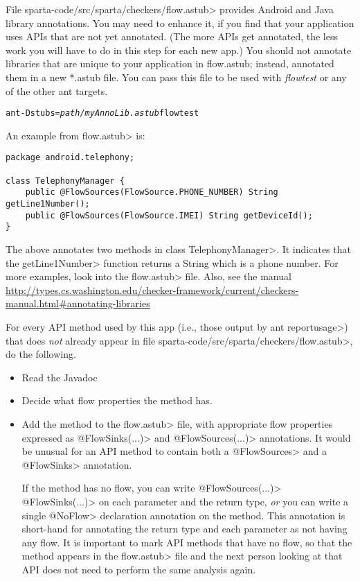 File \<sparta-code/src/sparta/checkers/flow.astub> provides Android and Java
library annotations.  You may need to enhance it, if you find that your application
uses APIs that are not yet annotated.
(The  more APIs get annotated, the less work you will have to do in this
step for each new app.) You should not annotate libraries that are unique to your application in flow.astub;
instead, annotated them in a new *.astub file. You can pass this file to be used with 
\emph{flowtest} or any of the other ant targets.

\begin{alltt}
ant -Dstubs=\emph{path/myAnnoLib.astub} flowtest
\end{alltt}



An example from \<flow.astub> is:

\begin{Verbatim}
package android.telephony;

class TelephonyManager {
    public @FlowSources(FlowSource.PHONE_NUMBER) String getLine1Number();
    public @FlowSources(FlowSource.IMEI) String getDeviceId();
}
\end{Verbatim}

\noindent
The above annotates two methods in class \<TelephonyManager>.
It indicates that the \<getLine1Number> function returns a String which is a
phone number.  For more examples, look into the \<flow.astub> file. Also, see 
the manual \url{http://types.cs.washington.edu/checker-framework/current/checkers-manual.html#annotating-libraries}

For every API method used by this app (i.e., those output by \<ant
reportusage>) that does \emph{not} already appear in file
\<sparta-code/src/sparta/checkers/flow.astub>, do the following.
\begin{itemize}
\item
Read the Javadoc
\item
Decide what flow properties the method has.
\item
Add the method to the \<flow.astub> file, with
appropriate flow properties expressed as \<@FlowSinks(...)> and
\<@FlowSources(...)> annotations.
It would be unusual for an API method to contain both a \<@FlowSources>
and a \<@FlowSinks> annotation.

If the method has no flow, you can write  
\<@FlowSources(...)> \<@FlowSinks(...)>  on each parameter and the return type, 
\emph{or} you can write a single 
\<@NoFlow> declaration annotation on the method.
This annotation is short-hand for annotating the return type and each
parameter as not having any flow.
It is important to mark API methods that have no flow, so that the method
appears in the \<flow.astub> file and the next person looking at that
API does not need to perform the same analysis again.
\end{itemize}


